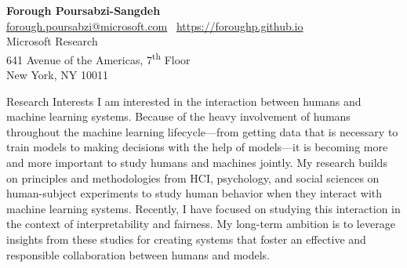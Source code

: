 \documentclass{resume} %
\begin{document}
{\Huge \textbf{Forough Poursabzi-Sangdeh}}\\
\href{mailto:forough.poursabzi@microsoft.com}{forough.poursabzi@microsoft.com} \textbullet \
\url{https://foroughp.github.io}\\
Microsoft Research\\
641 Avenue of the Americas, 7\textsuperscript{th} Floor\\
New York, NY 10011


\begin{rSection}{Research Interests}
I am interested in the interaction between humans and machine learning systems. Because of the heavy involvement of humans throughout the machine learning lifecycle---from getting data that is necessary to train models to making decisions with the help of models---it is becoming more and more important to study humans and machines jointly. My research builds on principles and methodologies from HCI, psychology, and social sciences on human-subject experiments to study human behavior when they interact with machine learning systems. Recently, I have focused on studying this interaction in the context of interpretability and fairness. My long-term ambition is to leverage insights from these studies for creating systems that foster an effective and responsible collaboration between humans and models.

\end{rSection}

\end{document}

